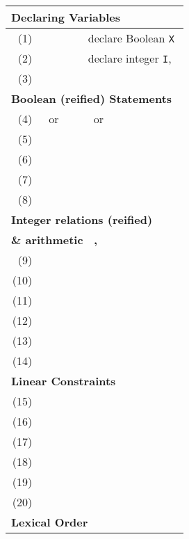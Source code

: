 \documentclass[runningheads,a4paper]{llncs}
\begin{document}
\begin{table}[t]\footnotesize
  \centering
\begin{tabular}{rlll}
\hline\hline
\multicolumn{4}{l}{\bf\small Declaring Variables}\\
\hline
(1)& & &declare Boolean \texttt{X}
\\
(2)& & & declare integer \texttt{I}, 
\\
(3)&     &
          &
          \\
\hline

\multicolumn{4}{l}{\bf\small Boolean (reified) Statements~ 
       \hfill }\\
\hline
(4)&     ~or~ &
          &
           ~or~ \\
(5)&     &
          &
          \\
(6)&     &
          &
          \\
(7)&     &
          &
          \\
(8)& &&
          \\
\hline

\multicolumn{4}{l}{\bf\small Integer relations (reified)
                    \hfill }\\
\multicolumn{4}{l}{\bf\small \& arithmetic \hfill
            ~, 
               }\\
    \hline
(9)&     &
          &
          \\
(10)&     &
          &
          \\
(11)&     &
          &
          \\

(12)& &
      &
      \\
(13)& &
      &
      \\
(14)& &
      &
      \\
\hline

\multicolumn{4}{l}{\bf\small  Linear Constraints~
            \hfill }\\
    \hline
(15)&     &
          &
          \\
(16)& &
      &
          \\
(17)& &
      &
          \\

(18)& &
      &
          \\
(19)& &
      &
          \\

(20)& &
      &
          \\
\hline


\multicolumn{4}{l}{\bf\small  Lexical Order}\\
    \hline


\end{tabular}
\end{table}
\end{document}
